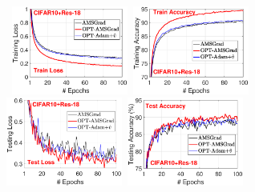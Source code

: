 \documentclass[wcp]{jmlr}
\begin{document}
\begin{figure}[t]
\mbox{\hspace{-0.2in}
\includegraphics[width=1.5in]{new_figure/cifar10_train_loss_disz.eps}\hspace{-0.12in}
\includegraphics[width=1.5in]{new_figure/cifar10_train_acc_disz.eps}\hspace{-0.12in}
\includegraphics[width=1.5in]{new_figure/cifar10_test_loss_disz.eps}\hspace{-0.12in}
\includegraphics[width=1.5in]{new_figure/cifar10_test_acc_disz.eps}
}


\end{figure}
\end{document}
